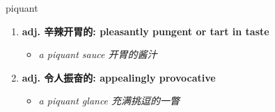 
\begin{frame}
{\huge piquant}
\begin{center}
\begin{enumerate}\Large
  \item \textbf{adj. 辛辣开胃的: pleasantly pungent or tart in taste}
  \begin{itemize}
    \item \em{\Large{a piquant sauce 开胃的酱汁}}
  \end{itemize}
  \item \textbf{adj. 令人振奋的: appealingly provocative}
  \begin{itemize}
    \item \em{\Large{a piquant glance 充满挑逗的一瞥}}
  \end{itemize}
\end{enumerate}
\end{center}
\end{frame}
